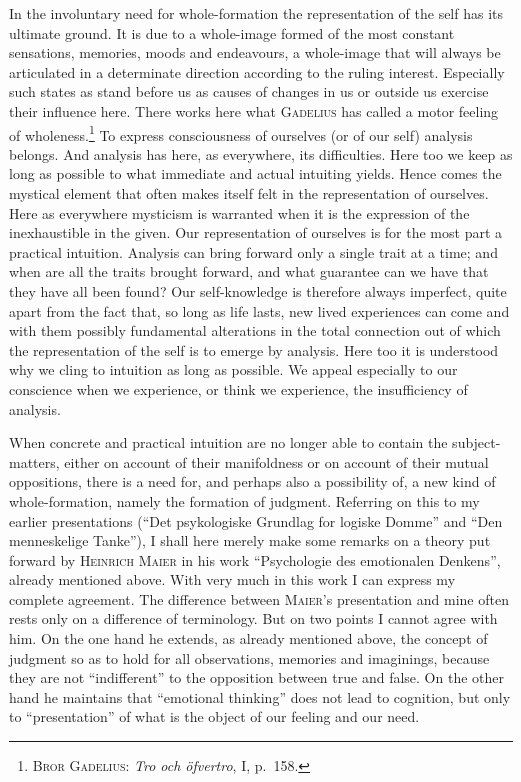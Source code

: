 \documentclass[12pt]{book}
\begin{document}
In the involuntary need for whole-formation the representation of the self has
its ultimate ground. It is due to a whole-image formed of the most constant
sensations, memories, moods and endeavours, a whole-image that will always be
articulated in a determinate direction according to the ruling interest.
Especially such states as stand before us as causes of changes in us or outside
us exercise their influence here. There works here what \textsc{Gadelius} has
called a motor feeling of wholeness.\footnote{\textsc{Bror Gadelius}:
\textit{Tro och öfvertro}, I, p.\ 158.} To express consciousness of ourselves
(or of our self) analysis belongs. And analysis has here, as everywhere, its
difficulties. Here too we keep as long as possible to what immediate and actual
intuiting yields. Hence comes the mystical element that often makes itself felt
in the representation of ourselves. Here as everywhere mysticism is warranted
when it is the expression of the inexhaustible in the given. Our representation
of ourselves is for the most part a practical intuition. Analysis can bring
forward only a single trait at a time; and when are all the traits brought
forward, and what guarantee can we have that they have all been found? Our
self-knowledge is therefore always imperfect, quite apart from the fact that, so
long as life lasts, new lived experiences can come and with them possibly
fundamental alterations in the total connection out of which the representation
of the self is to emerge by analysis. Here too it is understood why we cling to
intuition as long as possible. We appeal especially to our conscience when we
experience, or think we experience, the insufficiency of analysis.

When concrete and practical intuition are no longer able to contain the
subject-matters, either on account of their manifoldness or on account of their
mutual oppositions, there is a need for, and perhaps also a possibility of, a
new kind of whole-formation, namely the formation of judgment. Referring on this
to my earlier presentations (``Det psykologiske Grundlag for logiske Domme'' and
``Den menneskelige Tanke''), I shall here merely make some remarks on a theory
put forward by \textsc{Heinrich Maier} in his work ``Psychologie des emotionalen
Denkens'', already mentioned above. With very much in this work I can express my
complete agreement. The difference between \textsc{Maier}'s presentation and
mine often rests only on a difference of terminology. But on two points I cannot
agree with him. On the one hand he extends, as already mentioned above, the
concept of judgment so as to hold for all observations, memories and
imaginings, because they are not ``indifferent'' to the opposition between true
and false. On the other hand he maintains that ``emotional thinking'' does not
lead to cognition, but only to ``presentation'' of what is the object of our
feeling and our need.
\end{document}
